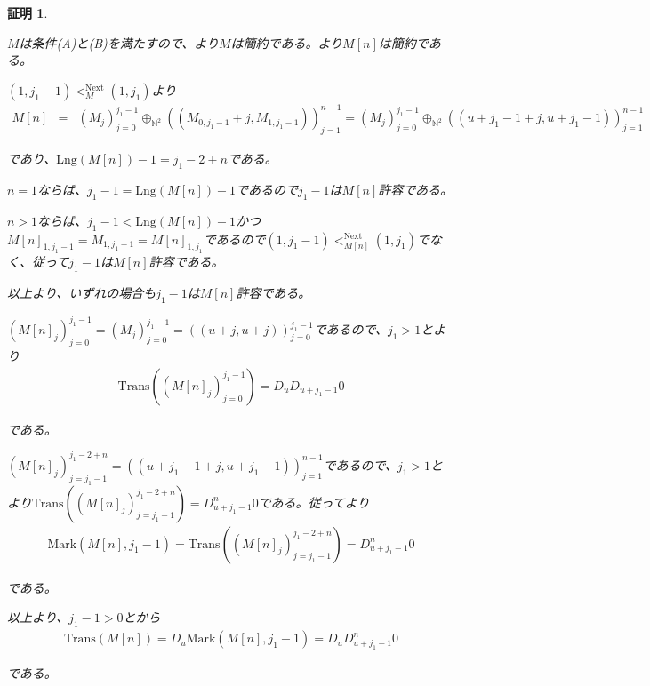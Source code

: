 \documentclass[dvipdfmx,uplatex]{jsarticle}
\theoremstyle{customnonumberbreakfortheorem}
\theoremstyle{customnonumberbreakforproof}
\newtheorem{hideableproof}{証明}
\begin{document}
\begin{hideableproof}
	\begin{indented}
		\item \(M\)は条件(A)と(B)を満たすので、より\(M\)は簡約である。より\(M[n]\)は簡約である。
		\item \((1,j_1-1) <_M^{\textrm{Next}} (1,j_1)\)より
		\begin{eqnarray*}
		M[n] & = & (M_j)_{j=0}^{j_1-1} \oplus_{\mathbb{N}^2} ((M_{0,j_1-1}+j,M_{1,j_1-1}))_{j=1}^{n-1} = (M_j)_{j=0}^{j_1-1} \oplus_{\mathbb{N}^2} ((u+j_1-1+j,u+j_1-1))_{j=1}^{n-1}
		\end{eqnarray*}
		\item であり、\(\textrm{Lng}(M[n])-1 = j_1-2+n\)である。
		\item \(n = 1\)ならば、\(j_1-1 = \textrm{Lng}(M[n])-1\)であるので\(j_1-1\)は\(M[n]\)許容である。
		\item \(n > 1\)ならば、\(j_1-1 < \textrm{Lng}(M[n])-1\)かつ\(M[n]_{1,j_1-1} = M_{1,j_1-1} = M[n]_{1,j_1}\)であるので\((1,j_1-1) <_{M[n]}^{\textrm{Next}} (1,j_1)\)でなく、従って\(j_1-1\)は\(M[n]\)許容である。
		\item 以上より、いずれの場合も\(j_1-1\)は\(M[n]\)許容である。
		\item \((M[n]_j)_{j=0}^{j_1-1} = (M_j)_{j=0}^{j_1-1} = ((u+j,u+j))_{j=0}^{j_1-1}\)であるので、\(j_1 > 1\)とより
		\begin{eqnarray*}
		\textrm{Trans}((M[n]_j)_{j=0}^{j_1-1}) = D_u D_{u+j_1-1} 0
		\end{eqnarray*}
		\item である。
		\item \((M[n]_j)_{j=j_1-1}^{j_1-2+n} = ((u+j_1-1+j,u+j_1-1))_{j=1}^{n-1}\)であるので、\(j_1 > 1\)とより\(\textrm{Trans}((M[n]_j)_{j=j_1-1}^{j_1-2+n}) = D_{u+j_1-1}^n 0\)である。従ってより
		\begin{eqnarray*}
		\textrm{Mark}(M[n],j_1-1) = \textrm{Trans}((M[n]_j)_{j=j_1-1}^{j_1-2+n}) = D_{u+j_1-1}^n 0
		\end{eqnarray*}
		\item である。
		\item 以上より、\(j_1-1 > 0\)とから
		\begin{eqnarray*}
		\textrm{Trans}(M[n]) = D_u \textrm{Mark}(M[n],j_1-1) = D_u D_{u+j_1-1}^n 0
		\end{eqnarray*}
		\item である。
	\end{indented}
\end{hideableproof}
\end{document}
